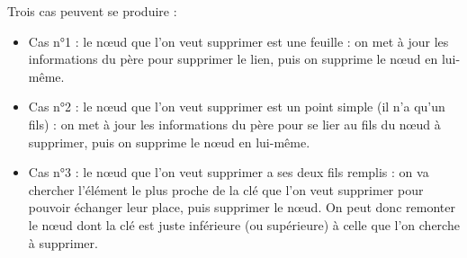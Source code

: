 \documentclass[11pt,a4paper]{article}
\begin{document}
Trois cas peuvent se produire :

\medskip

\begin{itemize}
\item Cas n°1 : le nœud que l'on veut supprimer est une feuille : on met à jour les informations du père pour supprimer le lien, puis on supprime le nœud en lui-même.

\item Cas n°2 : le nœud que l'on veut supprimer est un point simple (il n'a qu'un fils) : on met à jour les informations du père pour se lier au fils du nœud à supprimer, puis on supprime le nœud en lui-même.

\item Cas n°3 : le nœud que l'on veut supprimer a ses deux fils remplis : on va chercher l'élément le plus proche de la clé que l'on veut supprimer pour pouvoir échanger leur place, puis supprimer le nœud.
On peut donc remonter le nœud dont la clé est juste inférieure (ou supérieure) à celle que l'on cherche à supprimer.
\end{itemize}

\bigskip

\vfillFirst
\end{document}
